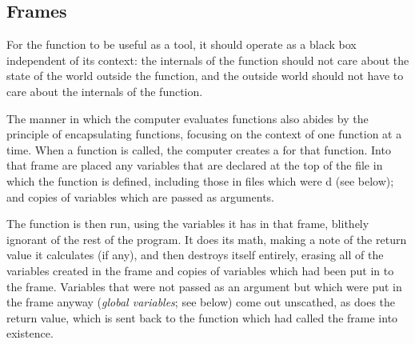 

\subsection{Frames} 
For the function to be useful as a tool, it should operate as a black
box independent of its context: the internals of the function should not
care about the state of the world outside the function, and the outside
world should not have to care about the internals of the function.

The manner in which the computer evaluates functions also abides by the
principle of encapsulating functions, focusing on the context of one
function at a time. When a function is called, the computer creates a
 for that function. Into that frame are placed any variables
that are declared at the top of the file in which the function is defined,
including those in files which were d (see below); and copies of
variables which are passed as arguments. 

The function is then run, using the variables it has in that frame,
blithely ignorant of the rest of the program. It does its math, making a
note of the return value it calculates (if any), and then destroys itself
entirely, erasing all of the variables created in the frame and copies
of variables which had been put in to the frame. Variables that were not
passed as an argument but which were put in the frame anyway ({\sl global
variables}; see below) come out unscathed, as does the return value, which
is sent back to the function which had called the frame into existence.

